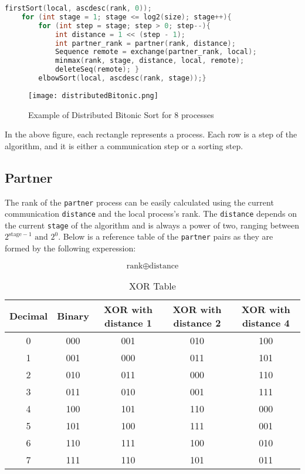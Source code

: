 \documentclass[12pt]{article}
\begin{document}
\begin{lstlisting}[language=C]
    firstSort(local, ascdesc(rank, 0));
    for (int stage = 1; stage <= log2(size); stage++){
        for (int step = stage; step > 0; step--){
            int distance = 1 << (step - 1);
            int partner_rank = partner(rank, distance);
            Sequence remote = exchange(partner_rank, local);
            minmax(rank, stage, distance, local, remote);
            deleteSeq(remote); }
        elbowSort(local, ascdesc(rank, stage));}
\end{lstlisting}

\begin{figure}[H]
    \centering
    \texttt{[image: distributedBitonic.png]}
    \caption{Example of Distributed Bitonic Sort for 8 processes}
    \label{fig:enter-label}
\end{figure}

In the above figure, each rectangle represents a process. Each row is a step of the algorithm, and it is either a communication step or a sorting step.

\subsection{Partner}
The rank of the \texttt{partner} process can be easily calculated using the current communication \texttt{distance} and the local process's rank. The \texttt{distance} depends on the current \texttt{stage} of the algorithm and is always a power of two, ranging between \( 2^{\text{stage}-1} \text{ and } 2^0 \). Below is a reference table of the \texttt{partner} pairs as they are formed by the following experession:

\[\text{rank} \oplus \text{distance}\]
\begin{table}[h]
    \centering
    \begin{tabular}{|c|c|c|c|c|}
        \hline
        \textbf{Decimal} & \textbf{Binary} & \textbf{XOR with distance 1} & \textbf{XOR with distance 2} & \textbf{XOR with distance 4} \\ \hline
        0 & 000 & 001 & 010 & 100 \\ \hline
        1 & 001 & 000 & 011 & 101 \\ \hline
        2 & 010 & 011 & 000 & 110 \\ \hline
        3 & 011 & 010 & 001 & 111 \\ \hline
        4 & 100 & 101 & 110 & 000 \\ \hline
        5 & 101 & 100 & 111 & 001 \\ \hline
        6 & 110 & 111 & 100 & 010 \\ \hline
        7 & 111 & 110 & 101 & 011 \\ \hline
    \end{tabular}
    \caption{XOR Table}
    \label{tab:xor}
\end{table}
\end{document}
